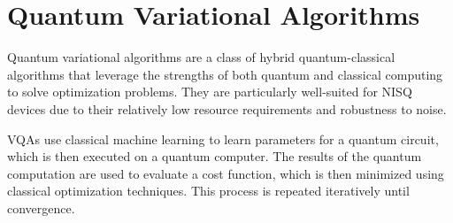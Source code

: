\section{Quantum Variational Algorithms}
Quantum variational algorithms are a class of hybrid quantum-classical algorithms that leverage the strengths of both quantum and classical computing to solve optimization problems. They are particularly well-suited for NISQ devices due to their relatively low resource requirements and robustness to noise.

VQAs use classical machine learning to learn parameters for a quantum circuit, which is then executed on a quantum computer. The results of the quantum computation are used to evaluate a cost function, which is then minimized using classical optimization techniques. This process is repeated iteratively until convergence.